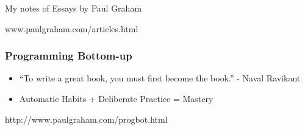 \begin{frame}[fragile]\frametitle{}
\begin{center}
{\Large My notes of Essays by Paul Graham}

{\tiny www.paulgraham.com/articles.html}


\end{center}
\end{frame}


\begin{frame}[fragile]\frametitle{Programming Bottom-up}

\begin{itemize}
\item ``To write a great book, you must first become the book.'' - Naval Ravikant 
\item Automatic Habits + Deliberate Practice = Mastery 
\end{itemize}

{\tiny http://www.paulgraham.com/progbot.html}

\end{frame}

